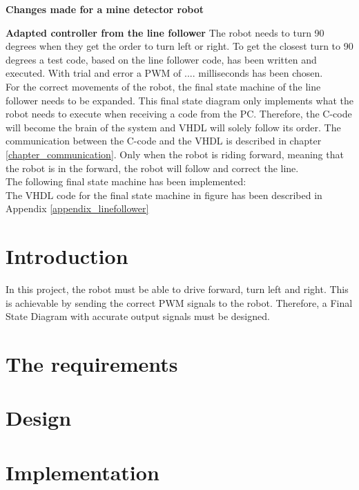 \textbf{Changes made for a mine detector robot}

\textbf{Adapted controller from the line follower}
The robot needs to turn 90 degrees when they get the order to turn left or right. To get the closest turn to 90 degrees a test code, based on the line follower code, has been written and executed. With trial and error a PWM of .... milliseconds has been chosen. \\

For the correct movements of the robot, the final state machine of the line follower needs to be expanded. This final state diagram only implements what the robot needs to execute when receiving a code from the PC. Therefore, the C-code will become the brain of the system and VHDL will solely follow its order. The communication between the C-code and the VHDL is described in chapter \ref{chapter_communication}. Only when the robot is riding forward, meaning that the robot is in the forward, the robot will follow and correct the line.\\

The following final state machine has been implemented: \\

The VHDL code for the final state machine in figure %
has been described in Appendix \ref{appendix_linefollower}
\\

\section{Introduction}
In this project, the robot must be able to drive forward, turn left and right. This is achievable by sending the correct PWM signals to the robot. Therefore, a Final State Diagram with accurate output signals must be designed.

\section{The requirements}

\section{Design}

\section{Implementation}

